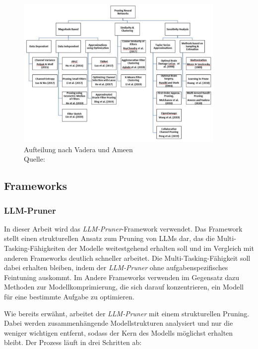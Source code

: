 \begin{figure}[H]
	\centering
	\includegraphics[width=0.9\textwidth]{images/pruning.png}
	\caption[Pruning-Methoden nach Vadera und Ameen]{Aufteilung nach Vadera und Ameen\\Quelle: \cite{vadera2022methods}}
	\label{fig:vadera}
\end{figure}

\subsection{Frameworks}

\subsubsection{LLM-Pruner}

In dieser Arbeit wird das \emph{LLM-Pruner}-Framework verwendet. Das Framework
stellt einen strukturellen Ansatz zum Pruning von LLMs dar, das die
Multi-Tasking-Fähigkeiten der Modelle weitestgehend erhalten soll und im
Vergleich mit anderen Frameworks deutlich schneller arbeitet. Die
Multi-Tasking-Fähigkeit soll dabei erhalten bleiben, indem der \emph{LLM-Pruner}
ohne aufgabenspezifisches Feintuning auskommt. Im Andere Frameworks verwenden im
Gegensatz dazu Methoden zur Modellkomprimierung, die sich darauf konzentrieren,
ein Modell für eine bestimmte Aufgabe zu optimieren.\autocite[Vgl.][]{llmpruner}

Wie bereits erwähnt, arbeitet der \emph{LLM-Pruner} mit einem strukturellen
Pruning. Dabei werden zusammenhängende Modellstrukturen analysiert und nur die
weniger wichtigen entfernt, sodass der Kern des Modells möglichst erhalten
bleibt. Der Prozess läuft in drei Schritten ab:

